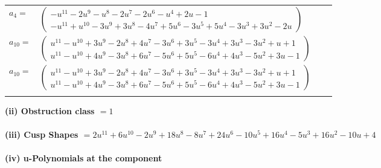 \documentclass[1p]{elsarticle_modified}
\theoremstyle{definition}
\begin{document}
\begin{tabular}{m{7pt} m{180pt} m{7pt} m{180pt} }
\flushright $a_{4}=$&$\begin{pmatrix}- u^{11}-2 u^9- u^8-2 u^7-2 u^6- u^4+2 u-1\\- u^{11}+u^{10}-3 u^9+3 u^8-4 u^7+5 u^6-3 u^5+5 u^4-3 u^3+3 u^2-2 u\end{pmatrix}$ \\
\flushright $a_{10}=$&$\begin{pmatrix}u^{11}- u^{10}+3 u^9-2 u^8+4 u^7-3 u^6+3 u^5-3 u^4+3 u^3-3 u^2+u+1\\u^{11}- u^{10}+4 u^9-3 u^8+6 u^7-5 u^6+5 u^5-6 u^4+4 u^3-5 u^2+3 u-1\end{pmatrix}$\\ \flushright $a_{10}=$&$\begin{pmatrix}u^{11}- u^{10}+3 u^9-2 u^8+4 u^7-3 u^6+3 u^5-3 u^4+3 u^3-3 u^2+u+1\\u^{11}- u^{10}+4 u^9-3 u^8+6 u^7-5 u^6+5 u^5-6 u^4+4 u^3-5 u^2+3 u-1\end{pmatrix}$\\&\end{tabular}
\flushleft \textbf{(ii) Obstruction class $= 1$}\\~\\
\flushleft \textbf{(iii) Cusp Shapes $= 2 u^{11}+6 u^{10}-2 u^9+18 u^8-8 u^7+24 u^6-10 u^5+16 u^4-5 u^3+16 u^2-10 u+4$}\\~\\
\newpage\renewcommand{\arraystretch}{1}
\flushleft \textbf{(iv) u-Polynomials at the component}\newline \\
\end{document}
